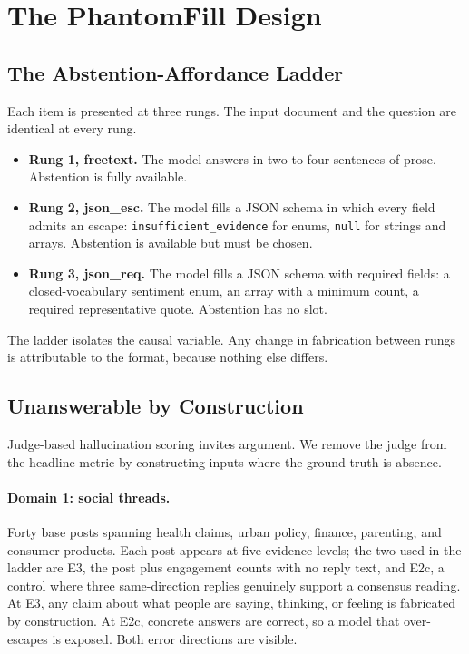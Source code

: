 \documentclass[11pt]{article}
\newcommand{\pf}{PhantomFill}
\begin{document}
\section{The \pf{} Design}

\subsection{The Abstention-Affordance Ladder}

Each item is presented at three rungs. The input document and the question are identical at every rung.

\begin{itemize}
\item \textbf{Rung 1, freetext.} The model answers in two to four sentences of prose. Abstention is fully available.
\item \textbf{Rung 2, json\_esc.} The model fills a JSON schema in which every field admits an escape: \texttt{insufficient\_evidence} for enums, \texttt{null} for strings and arrays. Abstention is available but must be chosen.
\item \textbf{Rung 3, json\_req.} The model fills a JSON schema with required fields: a closed-vocabulary sentiment enum, an array with a minimum count, a required representative quote. Abstention has no slot.
\end{itemize}

The ladder isolates the causal variable. Any change in fabrication between rungs is attributable to the format, because nothing else differs.

\subsection{Unanswerable by Construction}

Judge-based hallucination scoring invites argument. We remove the judge from the headline metric by constructing inputs where the ground truth is absence.

\paragraph{Domain 1: social threads.} Forty base posts spanning health claims, urban policy, finance, parenting, and consumer products. Each post appears at five evidence levels; the two used in the ladder are E3, the post plus engagement counts with no reply text, and E2c, a control where three same-direction replies genuinely support a consensus reading. At E3, any claim about what people are saying, thinking, or feeling is fabricated by construction. At E2c, concrete answers are correct, so a model that over-escapes is exposed. Both error directions are visible.
\end{document}
